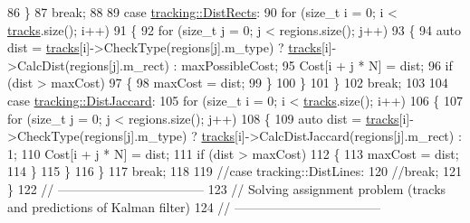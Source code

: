 \begin{DoxyCode}
86             \}
87             \textcolor{keywordflow}{break};
88 
89         \textcolor{keywordflow}{case} \mbox{\hyperlink{namespacetracking_a55743c5e18b9b228c4ba2587260b2502a43af27628a9ee8e94a23c079eab5d448}{tracking::DistRects}}:
90             \textcolor{keywordflow}{for} (\textcolor{keywordtype}{size\_t} i = 0; i < \mbox{\hyperlink{class_c_tracker_a86d322bc042985711c8d5ec8b9614230}{tracks}}.size(); i++)
91             \{
92                 \textcolor{keywordflow}{for} (\textcolor{keywordtype}{size\_t} j = 0; j < regions.size(); j++)
93                 \{
94                     \textcolor{keyword}{auto} dist = \mbox{\hyperlink{class_c_tracker_a86d322bc042985711c8d5ec8b9614230}{tracks}}[i]->CheckType(regions[j].m\_type) ? 
      \mbox{\hyperlink{class_c_tracker_a86d322bc042985711c8d5ec8b9614230}{tracks}}[i]->CalcDist(regions[j].m\_rect) : maxPossibleCost;
95                     Cost[i + j * N] = dist;
96                     \textcolor{keywordflow}{if} (dist > maxCost)
97                     \{
98                         maxCost = dist;
99                     \}
100                 \}
101             \}
102             \textcolor{keywordflow}{break};
103 
104         \textcolor{keywordflow}{case} \mbox{\hyperlink{namespacetracking_a55743c5e18b9b228c4ba2587260b2502a731b827afcbde6eb19624ad6130b1798}{tracking::DistJaccard}}:
105             \textcolor{keywordflow}{for} (\textcolor{keywordtype}{size\_t} i = 0; i < \mbox{\hyperlink{class_c_tracker_a86d322bc042985711c8d5ec8b9614230}{tracks}}.size(); i++)
106             \{
107                 \textcolor{keywordflow}{for} (\textcolor{keywordtype}{size\_t} j = 0; j < regions.size(); j++)
108                 \{
109                     \textcolor{keyword}{auto} dist = \mbox{\hyperlink{class_c_tracker_a86d322bc042985711c8d5ec8b9614230}{tracks}}[i]->CheckType(regions[j].m\_type) ? 
      \mbox{\hyperlink{class_c_tracker_a86d322bc042985711c8d5ec8b9614230}{tracks}}[i]->CalcDistJaccard(regions[j].m\_rect) : 1;
110                     Cost[i + j * N] = dist;
111                     \textcolor{keywordflow}{if} (dist > maxCost)
112                     \{
113                         maxCost = dist;
114                     \}
115                 \}
116             \}
117             \textcolor{keywordflow}{break};
118 
119         \textcolor{comment}{//case tracking::DistLines:}
120             \textcolor{comment}{//break;}
121         \}
122         \textcolor{comment}{// -----------------------------------}
123         \textcolor{comment}{// Solving assignment problem (tracks and predictions of Kalman filter)}
124         \textcolor{comment}{// -----------------------------------}

\end{DoxyCode}
